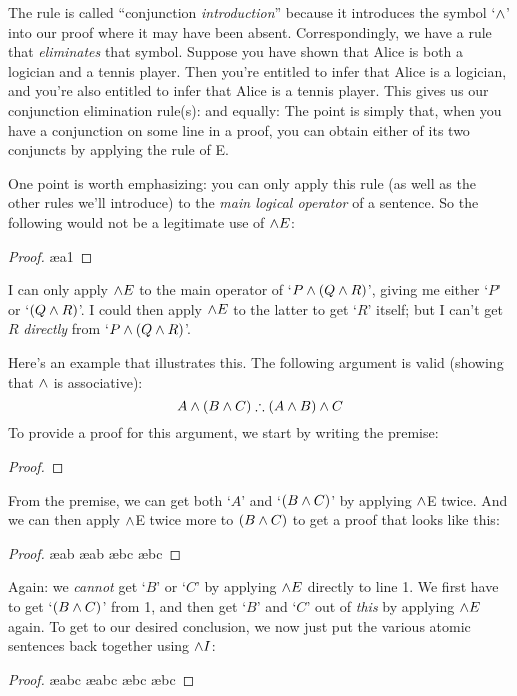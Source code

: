 The rule is called ``conjunction \emph{introduction}'' because it introduces the symbol `$\wedge$' into our proof where it may have been absent. Correspondingly, we have a rule that \emph{eliminates} that symbol.  Suppose you have shown that Alice is both a logician and a tennis player. Then you're entitled to infer that Alice is a logician, and you're also entitled to infer that Alice is a tennis player. This gives us our conjunction elimination rule(s):
and equally:
The point is simply that, when you have a conjunction on some line in a proof, you can obtain either of its two conjuncts by applying the rule of {\eand}E.

One point is worth emphasizing: you can only apply this rule (as well as the other rules we'll introduce) to the \emph{main logical operator} of a sentence.  So the following would not be a legitimate use of $\wedge E$:

\begin{proof}
	 \ae{a1}
\end{proof}
I can only apply $\wedge E$ to the main operator of `$P \wedge (Q \wedge R)$', giving me either `$P$' or `$(Q \wedge R)$'.  I could then apply $\wedge E$ to the latter to get `$R$' itself; but I can't get $R$ \emph{directly} from `$P \wedge (Q \wedge R)$'.

Here's an example that illustrates this. The following argument is valid (showing that $\wedge$ is associative):
	$$A \wedge (B \wedge C) \therefore (A \wedge B) \wedge C$$
To provide a proof for this argument, we start by writing the premise:
\begin{proof}
	  
\end{proof}
From the premise, we can get both `$A$' and `$(B \wedge C)$' by applying $\wedge$E twice. And we can then apply $\wedge$E twice more to $(B \wedge C)$ to get a proof that looks like this:
\begin{proof}
	  
	 \ae{ab}
	 \ae{ab}
	 \ae{bc}
	 \ae{bc}
\end{proof}
Again: we \emph{cannot} get `$B$' or `$C$' by applying $\wedge E$ directly to line 1.  We first have to get `$(B \wedge C)$' from 1, and then get `$B$' and `$C$' out of \emph{this} by applying $\wedge E$ again. To get to our desired conclusion, we now just put the various atomic sentences back together using $\wedge I$:
\begin{proof}
	  
	 \ae{abc}
	 \ae{abc}
	 \ae{bc}
	 \ae{bc}
\end{proof}

